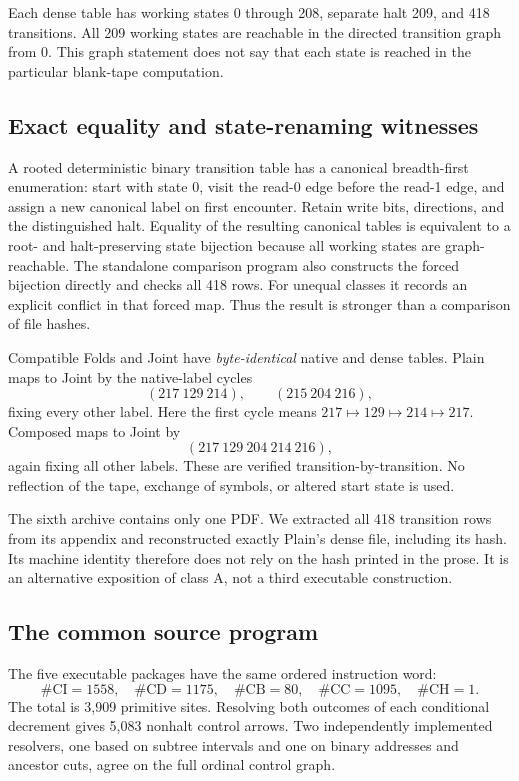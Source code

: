 \documentclass[11pt,letterpaper]{article}
\begin{document}
Each dense table has working states 0 through 208, separate halt 209, and
418 transitions. All 209 working states are reachable in the directed
transition graph from 0. This graph statement does not say that each state
is reached in the particular blank-tape computation.

\subsection{Exact equality and state-renaming witnesses}

A rooted deterministic binary transition table has a canonical breadth-first
enumeration: start with state 0, visit the read-0 edge before the read-1 edge,
and assign a new canonical label on first encounter. Retain write bits,
directions, and the distinguished halt. Equality of the resulting canonical
tables is equivalent to a root- and halt-preserving state bijection because
all working states are graph-reachable. The standalone comparison program
also constructs the forced bijection directly and checks all 418 rows.
For unequal classes it records an explicit conflict in that forced map.
Thus the result is stronger than a comparison of file hashes.

Compatible Folds and Joint have \emph{byte-identical} native and dense
tables. Plain maps to Joint by the native-label cycles
\[
(217\ 129\ 214),\qquad(215\ 204\ 216),
\]
fixing every other label. Here the first cycle means
\(217\mapsto129\mapsto214\mapsto217\). Composed maps to Joint by
\[
(217\ 129\ 204\ 214\ 216),
\]
again fixing all other labels. These are verified transition-by-transition.
No reflection of the tape, exchange of symbols, or altered start state is used.

The sixth archive contains only one PDF. We extracted all 418 transition
rows from its appendix and reconstructed exactly Plain's dense file,
including its hash. Its machine identity therefore does not rely on the
hash printed in the prose. It is an alternative exposition of class A,
not a third executable construction.

\subsection{The common source program}

The five executable packages have the same ordered instruction word:
\[
\#\mathrm{CI}=1558,\quad\#\mathrm{CD}=1175,\quad
\#\mathrm{CB}=80,\quad\#\mathrm{CC}=1095,\quad\#\mathrm{CH}=1.
\]
The total is 3,909 primitive sites. Resolving both outcomes of each
conditional decrement gives 5,083 nonhalt control arrows. Two independently
implemented resolvers, one based on subtree intervals and one on binary
addresses and ancestor cuts, agree on the full ordinal control graph.
\end{document}
